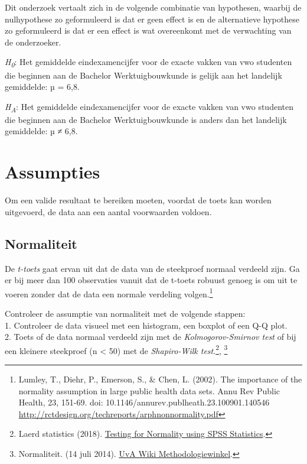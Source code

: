 \documentclass[
]{article}
\begin{document}
Dit onderzoek vertaalt zich in de volgende combinatie van hypothesen,
waarbij de nulhypothese zo geformuleerd is dat er geen effect is en de
alternatieve hypothese zo geformuleerd is dat er een effect is wat
overeenkomt met de verwachting van de onderzoeker.

\emph{H\textsubscript{0}}: Het gemiddelde eindexamencijfer voor de
exacte vakken van vwo studenten die beginnen aan de Bachelor
Werktuigbouwkunde is gelijk aan het landelijk gemiddelde: µ = 6,8.

\emph{H\textsubscript{A}}: Het gemiddelde eindexamencijfer voor de
exacte vakken van vwo studenten die beginnen aan de Bachelor
Werktuigbouwkunde is anders dan het landelijk gemiddelde: µ ≠ 6,8.

\hypertarget{assumpties}{%
\section{Assumpties}\label{assumpties}}

Om een valide resultaat te bereiken moeten, voordat de toets kan worden
uitgevoerd, de data aan een aantal voorwaarden voldoen.

\hypertarget{normaliteit}{%
\subsection{Normaliteit}\label{normaliteit}}

De \emph{t-toets} gaat ervan uit dat de data van de steekproef normaal
verdeeld zijn. Ga er bij meer dan 100 observaties vanuit dat de t-toets
robuust genoeg is om uit te voeren zonder dat de data een normale
verdeling volgen.\footnote{Lumley, T., Diehr, P., Emerson, S., \& Chen,
  L. (2002). The importance of the normality assumption in large public
  health data sets. Annu Rev Public Health, 23, 151-69. doi:
  10.1146/annurev.publheath.23.100901.140546
  \url{http://rctdesign.org/techreports/arphnonnormality.pdf}}

Controleer de assumptie van normaliteit met de volgende stappen:\\
1. Controleer de data visueel met een histogram, een boxplot of een Q-Q
plot.\\
2. Toets of de data normaal verdeeld zijn met de
\emph{Kolmogorov-Smirnov test} of bij een kleinere steekproef (n
\textless{} 50) met de \emph{Shapiro-Wilk test}.\footnote{Laerd
  statistics (2018).
  \href{https://statistics.laerd.com/spss-tutorials/testing-for-normality-using-spss-statistics.php}{Testing
  for Normality using SPSS Statistics}.}, \footnote{Normaliteit. (14
  juli 2014).
  \href{https://wiki.uva.nl/methodologiewinkel/index.php/Normaliteit}{UvA
  Wiki Methodologiewinkel}.}
\end{document}
